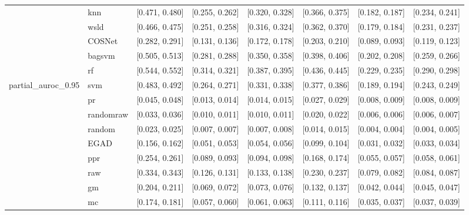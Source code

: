 \begin{table}[H]
{\begin{tabular}{llllllll}
 & knn & [0.471, 0.480] & [0.255, 0.262] & [0.320, 0.328] & [0.366, 0.375] & [0.182, 0.187] & [0.234, 0.241]\\

 & wsld & [0.466, 0.475] & [0.251, 0.258] & [0.316, 0.324] & [0.362, 0.370] & [0.179, 0.184] & [0.231, 0.237]\\

 & COSNet & [0.282, 0.291] & [0.131, 0.136] & [0.172, 0.178] & [0.203, 0.210] & [0.089, 0.093] & [0.119, 0.123]\\

 & bagsvm & [0.505, 0.513] & [0.281, 0.288] & [0.350, 0.358] & [0.398, 0.406] & [0.202, 0.208] & [0.259, 0.266]\\

 & rf & [0.544, 0.552] & [0.314, 0.321] & [0.387, 0.395] & [0.436, 0.445] & [0.229, 0.235] & [0.290, 0.298]\\

\multirow{-15}{*}{\raggedright\arraybackslash partial\_auroc\_0.95} & svm & [0.483, 0.492] & [0.264, 0.271] & [0.331, 0.338] & [0.377, 0.386] & [0.189, 0.194] & [0.243, 0.249]\\
\cmidrule{1-8}
 & pr & [0.045, 0.048] & [0.013, 0.014] & [0.014, 0.015] & [0.027, 0.029] & [0.008, 0.009] & [0.008, 0.009]\\

 & randomraw & [0.033, 0.036] & [0.010, 0.011] & [0.010, 0.011] & [0.020, 0.022] & [0.006, 0.006] & [0.006, 0.007]\\

 & random & [0.023, 0.025] & [0.007, 0.007] & [0.007, 0.008] & [0.014, 0.015] & [0.004, 0.004] & [0.004, 0.005]\\

 & EGAD & [0.156, 0.162] & [0.051, 0.053] & [0.054, 0.056] & [0.099, 0.104] & [0.031, 0.032] & [0.033, 0.034]\\

 & ppr & [0.254, 0.261] & [0.089, 0.093] & [0.094, 0.098] & [0.168, 0.174] & [0.055, 0.057] & [0.058, 0.061]\\

 & raw & [0.334, 0.343] & [0.126, 0.131] & [0.133, 0.138] & [0.230, 0.237] & [0.079, 0.082] & [0.084, 0.087]\\

 & gm & [0.204, 0.211] & [0.069, 0.072] & [0.073, 0.076] & [0.132, 0.137] & [0.042, 0.044] & [0.045, 0.047]\\

 & mc & [0.174, 0.181] & [0.057, 0.060] & [0.061, 0.063] & [0.111, 0.116] & [0.035, 0.037] & [0.037, 0.039]\\


\end{tabular}}
\end{table}
